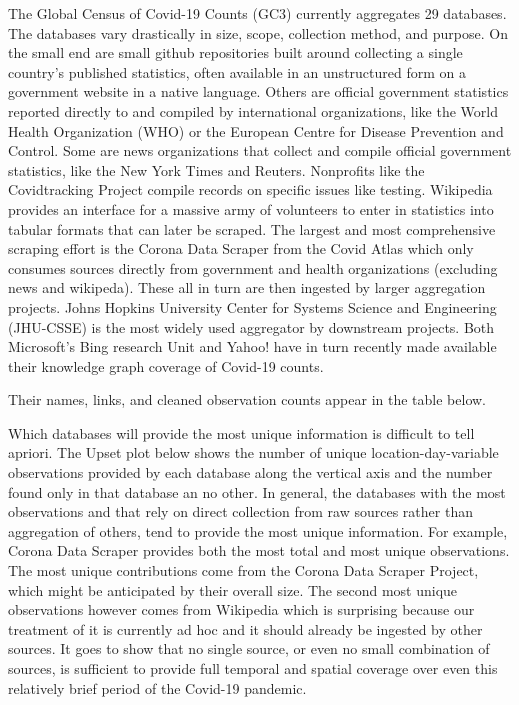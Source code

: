 \documentclass[
]{book}
\begin{document}
The Global Census of Covid-19 Counts (GC3) currently aggregates 29 databases. The databases vary drastically in size, scope, collection method, and purpose. On the small end are small github repositories built around collecting a single country's published statistics, often available in an unstructured form on a government website in a native language. Others are official government statistics reported directly to and compiled by international organizations, like the World Health Organization (WHO) or the European Centre for Disease Prevention and Control. Some are news organizations that collect and compile official government statistics, like the New York Times and Reuters. Nonprofits like the Covidtracking Project compile records on specific issues like testing. Wikipedia provides an interface for a massive army of volunteers to enter in statistics into tabular formats that can later be scraped. The largest and most comprehensive scraping effort is the Corona Data Scraper from the Covid Atlas which only consumes sources directly from government and health organizations (excluding news and wikipeda). These all in turn are then ingested by larger aggregation projects. Johns Hopkins University Center for Systems Science and Engineering (JHU-CSSE) is the most widely used aggregator by downstream projects. Both Microsoft's Bing research Unit and Yahoo! have in turn recently made available their knowledge graph coverage of Covid-19 counts.

Their names, links, and cleaned observation counts appear in the table below.

\hypertarget{htmlwidget-a022207f73edbca848d9}{}

Which databases will provide the most unique information is difficult to tell apriori. The Upset plot below shows the number of unique location-day-variable observations provided by each database along the vertical axis and the number found only in that database an no other. In general, the databases with the most observations and that rely on direct collection from raw sources rather than aggregation of others, tend to provide the most unique information. For example, Corona Data Scraper provides both the most total and most unique observations.
The most unique contributions come from the Corona Data Scraper Project, which might be anticipated by their overall size. The second most unique observations however comes from Wikipedia which is surprising because our treatment of it is currently ad hoc and it should already be ingested by other sources. It goes to show that no single source, or even no small combination of sources, is sufficient to provide full temporal and spatial coverage over even this relatively brief period of the Covid-19 pandemic.
\end{document}

